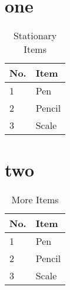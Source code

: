 \documentclass{article}
\begin{document}
	\tableofcontents
    \listoftables
    
    \section{one}
    \lipsum[1-2]

    \begin{table}[b]
        \centering
        \begin{tabular}{|l|l|}
	        \hline
	        No. & Item\\
	        \hline
	        1 & Pen\\
	        \hline
	        2 & Pencil\\
	        \hline
	        3 & Scale\\
	        \hline
        \end{tabular}
        \caption{Stationary Items}
    \end{table}

    \section{two}
    \lipsum[1-3]
    
    \begin{table}[h]
        \centering
        \begin{tabular}{|l|l|}
	        \hline
	        No. & Item\\
	        \hline
	        1 & Pen\\
	        \hline
	        2 & Pencil\\
	        \hline
	        3 & Scale\\
	        \hline
        \end{tabular}
        \caption{More Items}
    \end{table}
\end{document}
